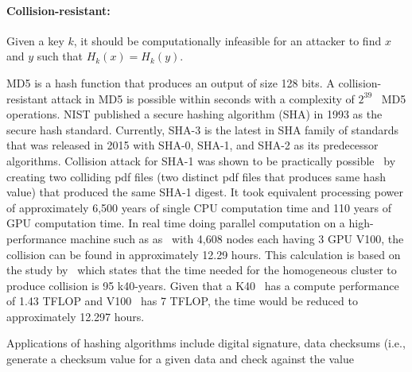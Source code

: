 \paragraph{Collision-resistant:} Given a key $k$, it should be computationally
infeasible for an attacker to find $x$ and $y$ such that $H_k(x) = H_k(y)$.
\par   
MD5 is a hash function that produces an output of size 128 bits. A
collision-resistant attack in MD5 is possible within seconds with a complexity
of $2^{39}$~\cite{wang2005break} MD5 operations. NIST published a secure
hashing algorithm (SHA) in 1993 as the secure hash standard. Currently, SHA-3
is the latest in SHA family of standards that was released in 2015 with SHA-0,
SHA-1, and SHA-2 as its predecessor algorithms. Collision attack for SHA-1 was
shown to be practically possible~\cite{stevens2017first} by creating two
colliding pdf files (two distinct pdf files that produces same hash value) that
produced the same SHA-1 digest. It took equivalent processing power of
approximately 6,500 years of single CPU computation time and 110 years of GPU
computation time. In real time doing parallel computation on a high-performance
machine such as as~\cite{oakridge,top500} with 4,608 nodes each having 3 GPU
V100, the collision can be found in approximately 12.29 hours. This calculation
is based on the study by~\cite{stevens2017first} which states that the time
needed for the homogeneous cluster to produce collision is 95 k40-years. Given
that a K40~\cite{k40} has a compute performance of 1.43 TFLOP and
V100~\cite{v100} has 7 TFLOP, the time would be reduced to approximately 12.297
hours.\par
Applications of hashing algorithms include digital signature, data checksums
(i.e., generate a checksum value for a given data and check against the value
